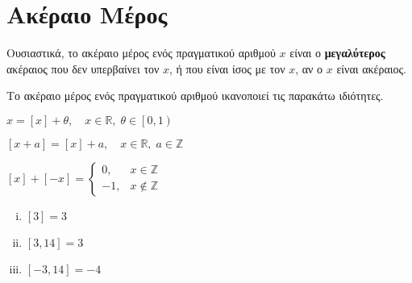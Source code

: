 \documentclass[main.tex]{subfiles}
\begin{document}
\section{Ακέραιο Μέρος}






Ουσιαστικά, το ακέραιο μέρος ενός πραγματικού αριθμού $ x $ είναι ο \textbf{μεγαλύτερος} ακέραιος που δεν υπερβαίνει τον $x$, ή που είναι ίσος με τον $x$,
αν ο $x$ είναι ακέραιος.

Το ακέραιο μέρος ενός πραγματικού αριθμού ικανοποιεί τις παρακάτω ιδιότητες.
\begin{myitemize}
  \item $ x = [x]+ \theta, \quad x \in \mathbb{R}, \; \theta \in \left[0,1\right) $
  \item $ [x+a]= [x] + a, \quad x \in \mathbb{R}, \; a \in \mathbb{Z} $
  \item $ [x]+[-x] = 
    \begin{cases} 
      0, & x \in \mathbb{Z} \\
      -1, & x \not \in \mathbb{Z}
    \end{cases}$
\end{myitemize}

\begin{example}
\item {}
  \begin{enumerate}[(i)]
    \item $ [3]=3 $
    \item $ [3,14] = 3  $
    \item $ [-3,14] =-4 $
  \end{enumerate}
\end{example}
\end{document}
